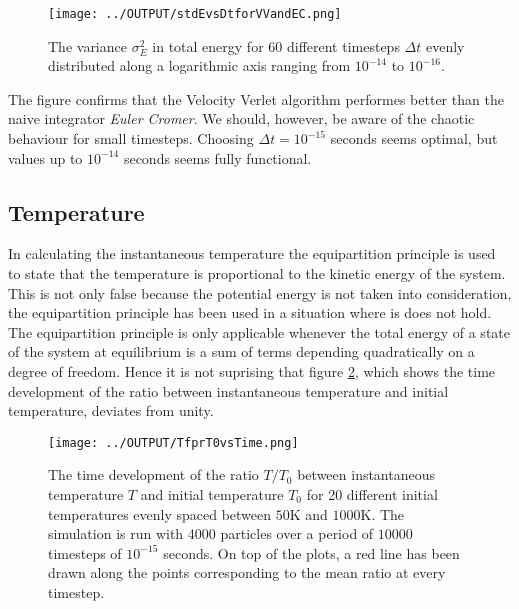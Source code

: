 \documentclass[twoside,utf8]{article}
\begin{document}
\begin{multicols}{2}
\begin{figure}[H]
\begin{center}
\texttt{[image: ../OUTPUT/stdEvsDtforVVandEC.png]}
\end{center}
\caption{The variance $\sigma_E^2$ in total energy for 60 different timesteps $\Delta t$ evenly distributed along a logarithmic axis ranging from $10^{-14}$ to $10^{-16}$. }
\label{stdEvsDtforVVandEC}
\end{figure}


\noindent
The figure confirms that the Velocity Verlet algorithm performes better than the naive integrator \textit{Euler Cromer}. We should, however, be aware of the chaotic behaviour for small timesteps. Choosing $\Delta t = 10^{-15}$ seconds seems optimal, but values up to $10^{-14}$ seconds seems fully functional.  


\subsection{Temperature}
In calculating the instantaneous temperature the equipartition principle is used to state that the temperature is proportional to the kinetic energy of the system. This is not only false because the potential energy is not taken into consideration, the equipartition principle has been used in a situation where is does not hold. The equipartition principle is only applicable whenever the total energy of a state of the system at equilibrium is a sum of terms depending quadratically on a degree of freedom. Hence it is not suprising that figure \ref*{TfprT0vsTime}, which shows the time development of the ratio between instantaneous temperature and initial temperature, deviates from unity. 


\begin{figure}[H]
\begin{center}
\texttt{[image: ../OUTPUT/TfprT0vsTime.png]}
\end{center}
\caption{
The time development of the ratio $T/T_0$ between instantaneous temperature $T$ and initial temperature $T_0$ for 20 different initial temperatures evenly spaced between $50$K and $1000$K. The simulation is run with $4000$ particles over a period of $10000$ timesteps of $10^{-15}$ seconds. On top of the plots, a red line has been drawn along the points corresponding to the mean ratio at every timestep.
}
\label{TfprT0vsTime}
\end{figure}


\end{multicols}
\end{document}
